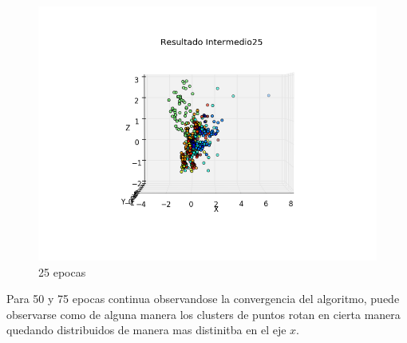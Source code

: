 \begin{figure}[h!]
  \centering
  \includegraphics[width=.6\linewidth]{convergencia_oja/1.png}
\caption{25 epocas}
\label{fig:test}
\end{figure}


\pagebreak

Para 50 y 75 epocas continua observandose la convergencia del algoritmo, puede observarse como de alguna manera los clusters de puntos rotan en cierta manera quedando distribuidos de manera mas distinitba en el eje $x$.

